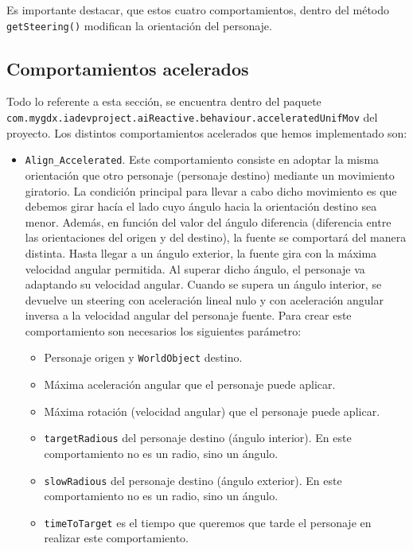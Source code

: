 Es importante destacar, que estos cuatro comportamientos, dentro del método \texttt{getSteering()} modifican la orientación del personaje.


\medskip
\subsection{Comportamientos acelerados}
Todo lo referente a esta sección, se encuentra dentro del paquete \\ \texttt{com.mygdx.iadevproject.aiReactive.behaviour.acceleratedUnifMov} del proyecto. Los distintos comportamientos acelerados que hemos implementado son:
\begin{itemize}
 \item \texttt{Align\_Accelerated}. Este comportamiento consiste en adoptar la misma orientación que otro personaje (personaje destino) mediante un movimiento giratorio. La condición principal para llevar a cabo dicho movimiento es que debemos girar hacía el lado cuyo ángulo hacia la orientación destino sea menor. Además, en función del valor del ángulo diferencia (diferencia entre las orientaciones del origen y del destino), la fuente se comportará del manera distinta. Hasta llegar a un ángulo exterior, la fuente gira con la máxima velocidad angular permitida. Al superar dicho ángulo, el personaje va adaptando su velocidad angular. Cuando se supera un ángulo interior, se devuelve un steering con aceleración lineal nulo y con aceleración angular inversa a la velocidad angular del personaje fuente. Para crear este comportamiento son necesarios los siguientes parámetro:
 \begin{itemize}
 	\item Personaje origen y \texttt{WorldObject} destino.
 	\item Máxima aceleración angular que el personaje puede aplicar.
 	\item Máxima rotación (velocidad angular) que el personaje puede aplicar.
 	\item \texttt{targetRadious} del personaje destino (ángulo interior). En este comportamiento no es un radio, sino un ángulo.
 	\item \texttt{slowRadious} del personaje destino (ángulo exterior). En este comportamiento no es un radio, sino un ángulo.
 	\item \texttt{timeToTarget} es el tiempo que queremos que tarde el personaje en realizar este comportamiento.
 \end{itemize}

\end{itemize}
